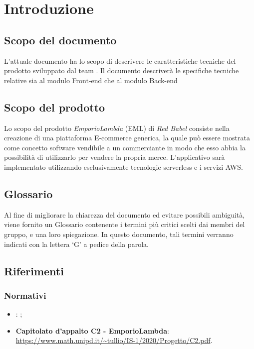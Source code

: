 \section{Introduzione}
\subsection{Scopo del documento}
L'attuale documento ha lo scopo di descrivere le caratteristiche tecniche del prodotto \nameproject{} sviluppato dal team \Omicron. Il documento descriverà le specifiche tecniche relative sia al modulo Front-end che al modulo Back-end
\subsection{Scopo del prodotto}
Lo scopo del prodotto \textit{EmporioLambda} (EML) di \textit{Red Babel} consiste nella creazione di una piattaforma E-commerce generica, la quale può essere mostrata come concetto software vendibile a un commerciante in modo che esso abbia la possibilità di utilizzarlo per vendere la propria merce. L'applicativo sarà implementato utilizzando esclusivamente tecnologie serverless e i servizi AWS.
\subsection{Glossario}
Al fine di migliorare la chiarezza del documento ed evitare possibili ambiguità, viene fornito un Glossario contenente i termini più critici scelti dai membri del gruppo, e una loro spiegazione. In questo documento, tali termini verranno indicati con la lettera `G' a pedice della parola.
\subsection{Riferimenti}
\subsubsection{Normativi}
\begin{itemize}
	\item \textbf{\NdP}: ;
	\item \textbf{Capitolato d'appalto C2 - EmporioLambda}: \\ \url{https://www.math.unipd.it/~tullio/IS-1/2020/Progetto/C2.pdf}.
\end{itemize}

